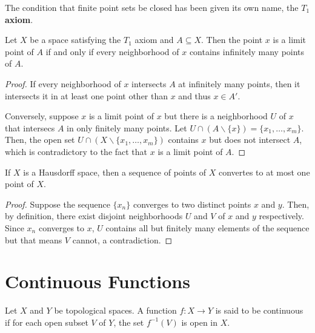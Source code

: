 The condition that finite point sets be closed has been given its own name, the \textbf{$T_1$ axiom}.

\begin{theorem}
    Let $X$ be a space satisfying the $T_1$ axiom and $A\subseteq X$. Then the point $x$ is a limit point of $A$ if and only if every neighborhood of $x$ contains infinitely many points of $A$.
\end{theorem}
\begin{proof}
    If every neighborhood of $x$ intersects $A$ at infinitely many points, then it intersects it in at least one point other than $x$ and thus $x\in A'$.
    
    Conversely, suppose $x$ is a limit point of $x$ but there is a neighborhood $U$ of $x$ that intersecs $A$ in only finitely many points. Let $U\cap(A\backslash\{x\}) = \{x_1,\ldots,x_m\}$. Then, the open set $U\cap(X\backslash\{x_1,\ldots,x_m\})$ contains $x$ but does not intersect $A$, which is contradictory to the fact that $x$ is a limit point of $A$.
\end{proof}

\begin{theorem}
    If $X$ is a Hausdorff space, then a sequence of points of $X$ convertes to at most one point of $X$.
\end{theorem}
\begin{proof}
    Suppose the sequence $\{x_n\}$ converges to two distinct points $x$ and $y$. Then, by definition, there exist disjoint neighborhoods $U$ and $V$ of $x$ and $y$ respectively. Since $x_n$ converges to $x$, $U$ contains all but finitely many elements of the sequence but that means $V$ cannot, a contradiction.
\end{proof}


\section{Continuous Functions}
\begin{definition}
    Let $X$ and $Y$ be topological spaces. A function $f:X\to Y$ is said to be continuous if for each open subset $V$ of $Y$, the set $f^{-1}(V)$ is open in $X$.
\end{definition}

